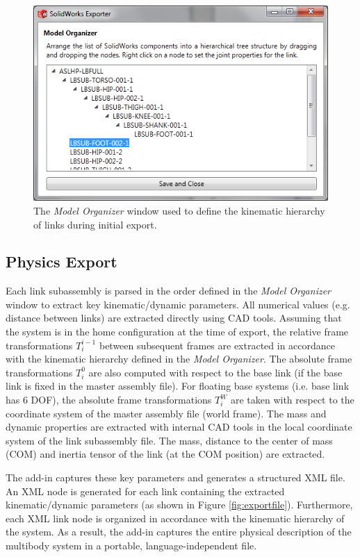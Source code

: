 \begin{figure}[!h]
	\centering
    \includegraphics[scale=1.0]{fig/toolchain/modelorg.png}
  	\caption{The \emph{Model Organizer} window used to define the kinematic hierarchy of links during initial export.}
	\label{fig:modelorg}
\end{figure}

\subsection{Physics Export} %
\label{sub:physics_export}
Each link subassembly is parsed in the order defined in the \emph{Model Organizer} window to extract key kinematic/dynamic parameters. All numerical values (e.g. distance between links) are extracted directly using CAD tools. Assuming that the system is in the home configuration at the time of export, the relative frame transformations $T^{i-1}_{i}$  between subsequent frames are extracted in accordance with the kinematic hierarchy defined in the \emph{Model Organizer}. The absolute frame transformations $T^{0}_{i}$ are also computed with respect to the base link (if the base link is fixed in the master assembly file). For floating base systems (i.e. base link has 6 DOF), the absolute frame transformations $T^{W}_{i}$ are taken with respect to the coordinate system of the master assembly file (world frame). The mass and dynamic properties are extracted with internal CAD tools in the local coordinate system of the link subassembly file. The mass, distance to the center of mass (COM) and inertia tensor of the link (at the COM position) are extracted.

The add-in captures these key parameters and generates a structured XML file. An XML node is generated for each link containing the extracted kinematic/dynamic parameters (as shown in Figure \ref{fig:exportfile}). Furthermore, each XML link node is organized in accordance with the kinematic hierarchy of the system. As a result, the add-in captures the entire physical description of the multibody system in a portable, language-independent file.

